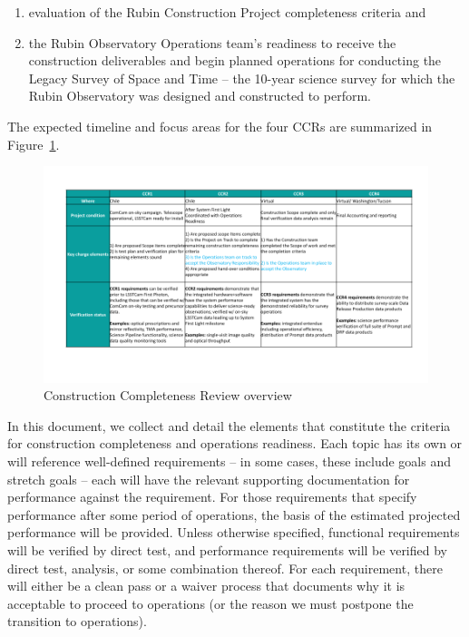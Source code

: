 \begin{enumerate}
        \item evaluation of the Rubin Construction Project completeness criteria and
        \item the Rubin Observatory Operations team's readiness to receive the construction deliverables and begin planned operations for conducting the Legacy Survey of Space and Time -- the 10-year science survey for which the Rubin Observatory was designed and constructed to perform.
\end{enumerate}

\noindent The expected timeline and focus areas for the four CCRs are summarized in Figure~\ref{CCRs_overview}.

\begin{figure}[htbp]
\begin{center}
\includegraphics[width=1\textwidth]{./CCRs_overview.png}
\caption{Construction Completeness Review overview}
\label{CCRs_overview}
\end{center}
\end{figure}

In this document, we collect and detail the elements that constitute the criteria for construction completeness and operations readiness.
Each topic has its own or will reference well-defined requirements -- in some cases, these include goals and stretch goals -- each will have the relevant supporting documentation for performance against the requirement.
For those requirements that specify performance after some period of operations, the basis of the estimated projected performance will be provided.
Unless otherwise specified, functional requirements will be verified by direct test, and performance requirements will be verified by direct test, analysis, or some combination thereof.
For each requirement, there will either be a clean pass or a waiver process that documents why it is acceptable to proceed to operations (or the reason we must postpone the transition to operations).

